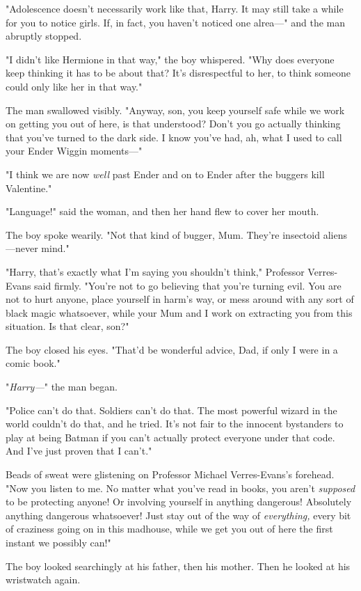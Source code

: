 "Adolescence doesn't necessarily work like that, Harry. It may still take a
while for you to notice girls. If, in fact, you haven't noticed one alrea---" and
the man abruptly stopped.

"I didn't like Hermione in that way," the boy whispered. "Why does everyone
keep thinking it has to be about that? It's disrespectful to her, to think
someone could only like her in that way."

The man swallowed visibly. "Anyway, son, you keep yourself safe while we work
on getting you out of here, is that understood? Don't you go actually thinking
that you've turned to the dark side. I know you've had, ah, what I used to call
your Ender Wiggin moments---"

"I think we are now \emph{well} past Ender and on to Ender after the buggers
kill Valentine."

"Language!" said the woman, and then her hand flew to cover her mouth.

The boy spoke wearily. "Not that kind of bugger, Mum. They're insectoid
aliens---never mind."

"Harry, that's exactly what I'm saying you shouldn't think," Professor
Verres-Evans said firmly. "You're not to go believing that you're turning evil.
You are not to hurt anyone, place yourself in harm's way, or mess around with
any sort of black magic whatsoever, while your Mum and I work on extracting you
from this situation. Is that clear, son?"

The boy closed his eyes. "That'd be wonderful advice, Dad, if only I were in a
comic book."

"\emph{Harry---}" the man began.

"Police can't do that. Soldiers can't do that. The most powerful wizard in the
world couldn't do that, and he tried. It's not fair to the innocent bystanders
to play at being Batman if you can't actually protect everyone under that code.
And I've just proven that I can't."

Beads of sweat were glistening on Professor Michael Verres-Evans's forehead.
"Now you listen to me. No matter what you've read in books, you aren't
\emph{supposed} to be protecting anyone! Or involving yourself in anything
dangerous! Absolutely anything dangerous whatsoever! Just stay out of the way
of \emph{everything,} every bit of craziness going on in this madhouse, while
we get you out of here the first instant we possibly can!"

The boy looked searchingly at his father, then his mother. Then he looked at
his wristwatch again.

